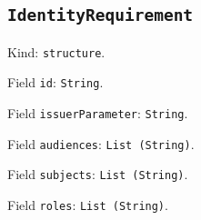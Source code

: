 \documentclass[11pt]{article}
\begin{document}
\subsection*{\texttt{IdentityRequirement}}
\noindent Kind: \texttt{structure}.\par
\noindent Field \texttt{id}: \texttt{String}.\par
\noindent Field \texttt{issuerParameter}: \texttt{String}.\par
\noindent Field \texttt{audiences}: \texttt{List (String)}.\par
\noindent Field \texttt{subjects}: \texttt{List (String)}.\par
\noindent Field \texttt{roles}: \texttt{List (String)}.\par
\end{document}

